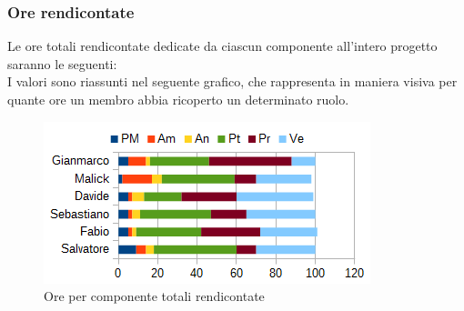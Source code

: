 		\subsubsection{Ore rendicontate}
		Le ore totali rendicontate dedicate da ciascun componente all'intero progetto saranno le seguenti: \\
		I valori sono riassunti nel seguente grafico, che rappresenta in maniera visiva per quante ore un membro abbia ricoperto un determinato ruolo.
		\begin{figure}[htbp]
			\centering
			\includegraphics[scale=1]{immagini/grafici/orario_rendicontato-barra.png}
			\caption{Ore per componente totali rendicontate}
		\end{figure}